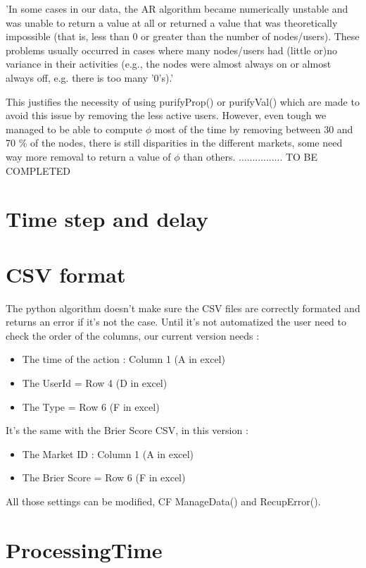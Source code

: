 \documentclass{report}
\begin{document}
'In some cases in our data, the AR algorithm became numerically unstable and was unable to return a value at all or returned a value that was theoretically impossible (that is, less than 0 or greater than the number of nodes/users). These problems usually occurred in cases where many nodes/users had (little or)no variance in their activities (e.g., the nodes were almost always on or almost always off, e.g. there is too many '0's).'

This justifies the necessity of using purifyProp() or purifyVal() which are made to avoid this issue by removing the less active users. However, even tough we managed to be able to compute $\phi $ most of the time by removing between 30 and 70 \% of the nodes, there is still disparities in the different markets, some need way more removal to return a value of  $\phi $ than others. ................ TO BE COMPLETED

\section{Time step and delay}
\section{CSV format}

The python algorithm doesn't make sure the CSV files are correctly formated and returns an error if it's not the case. Until it's not automatized the user need to check the order of the columns, our current version needs :

\begin{itemize}
\item The time of the action : Column 1 (A in excel)
\item The UserId = Row 4 (D in excel)
\item The Type = Row 6 (F in excel)
\end{itemize}

It's the same with the Brier Score CSV, in this version :
\begin{itemize}
\item The Market ID : Column 1 (A in excel)
\item The Brier Score = Row 6 (F in excel)
\end{itemize}

All those settings can be modified, CF ManageData() and RecupError().


\section{ProcessingTime}
\end{document}
